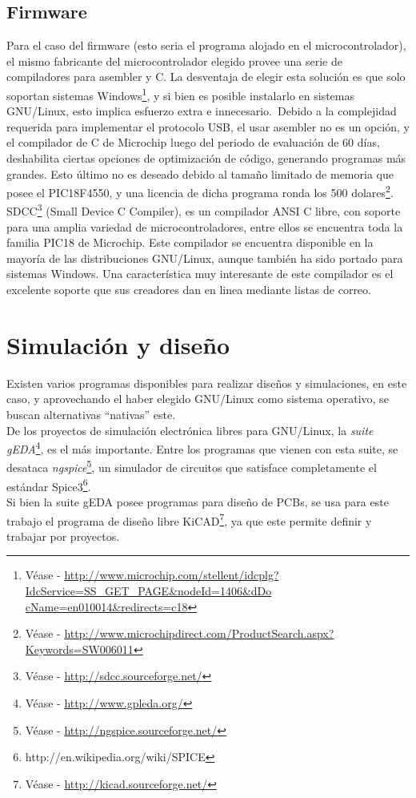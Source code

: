 \subsection{Firmware}
Para el caso del firmware (esto seria el programa alojado en el
microcontrolador), el mismo fabricante del microcontrolador elegido provee una
serie de compiladores para asembler y C. La desventaja de elegir esta
soluci\'on es que solo soportan sistemas Windows\footnote{V\'ease -
\url{
http://www.microchip.com/stellent/idcplg?IdcService=SS_GET_PAGE&nodeId=1406&dDo
cName=en010014&redirects=c18}}, y si bien es posible instalarlo en sistemas
GNU/Linux, esto implica esfuerzo extra e innecesario.\
Debido a la complejidad requerida para implementar el protocolo USB, el usar
asembler no es un opci\'on, y el compilador de C de Microchip luego del
periodo de evaluaci\'on de 60 d\'ias, deshabilita ciertas opciones de
optimizaci\'on de c\'odigo, generando programas m\'as grandes. Esto \'ultimo no
es
deseado debido al tama\~no limitado de memoria que posee el PIC18F4550, y una
licencia de dicha programa ronda los 500 dolares\footnote{V\'ease -
\url{http://www.microchipdirect.com/ProductSearch.aspx?Keywords=SW006011}}.\\

SDCC\footnote{V\'ease - \url{http://sdcc.sourceforge.net/}} (Small Device C
Compiler), es un compilador ANSI C libre, con soporte para una amplia variedad
de microcontroladores, entre ellos se encuentra toda la familia PIC18 de
Microchip. Este compilador se encuentra disponible en la mayor\'ia de las
distribuciones GNU/Linux, aunque tambi\'en ha sido portado para sistemas
Windows. Una caracter\'istica muy interesante de este compilador es el
excelente
soporte que sus creadores dan en linea mediante listas de correo.\\


\section{Simulaci\'on y dise\~no}
Existen varios programas disponibles para realizar dise\~nos y simulaciones,
en este caso, y aprovechando el haber elegido GNU/Linux como sistema
operativo, se buscan alternativas ``nativas'' este.\\

De los proyectos de simulaci\'on electr\'onica libres para GNU/Linux, la
\emph{suite gEDA}\footnote{V\'ease - \url{http://www.gpleda.org/}}, es el m\'as
importante. Entre los programas que vienen con esta suite, se desataca
\emph{ngspice}\footnote{V\'ease - \url{http://ngspice.sourceforge.net/}}, un
simulador de circuitos que satisface completamente el est\'andar
Spice3\footnote{http://en.wikipedia.org/wiki/SPICE}.\\

Si bien la suite gEDA posee programas para dise\~no de PCBs, se usa para este
trabajo el programa de dise\~no libre KiCAD\footnote{V\'ease -
\url{http://kicad.sourceforge.net/}}, ya que este permite definir y trabajar
por proyectos.






